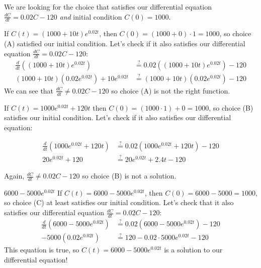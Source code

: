 \documentclass{article}
\begin{document}
\begin{enumerate}
\begin{enumerate}
      \begin{solution}
        We are looking for the choice that satisfies our differential
        equation $\frac{dC}{dt} = 0.02 C - 120$ \emph{and} initial
        condition $C(0) = 1000$.   
        \begin{enumerate}
            \plainitem If $C(t)=(1000 + 10t) e^{0.02 t}$, then $C(0)=(1000+0)\cdot 1=1000$, so choice (A) satisfied our initial condition. Let's check if it also satisfies our differential equation $\frac{dC}{dt} = 0.02 C - 120$: 
            \begin{align*}
          \frac{d}{dt} \left( (1000 + 10t) e^{0.02 t} \right) &
          \stackrel{?}{=} 0.02 \left( (1000 + 10t) e^{0.02 t} \right) -
          120 \\
          (1000+10t) \left(0.02 e^{0.02 t} \right) + 10 e^{0.02t}& \stackrel{?}{=} (1000+10t) \left(0.02 e^{0.02 t} \right) - 120
        \end{align*}
        We can see that $\frac{dC}{dt} \neq 0.02 C - 120$ so choice (A) is not the right function.
            
            \plainitem If $C(t)=1000 e^{0.02 t} + 120 t$ then $C(0)=(1000\cdot 1)+0=1000$, so choice (B) satisfies our initial condition. Let's check if it also satisfies our differential equation: 

            \begin{align}
                \frac{d}{dt} \left( 1000 e^{0.02 t} + 120 t \right) &
          \stackrel{?}{=} 0.02 \left( 1000 e^{0.02 t} + 120 t \right) -
          120 \\
          20 e^{0.02 t} + 120 &
          \stackrel{?}{=} 20e^{0.02 t} + 2.4 t -
          120
            \end{align}

            Again, $\frac{dC}{dt} \neq 0.02 C - 120$ so choice (B) is not a solution.
            
            \plainitem $6000 - 5000 e^{0.02 t}$
            If $C(t) = 6000 - 5000 e^{0.02 t}$, then $C(0) =
        6000 - 5000 = 1000$, so choice (C) at least satisfies our initial
        condition.  Let's check that it also satisfies our differential
        equation $\frac{dC}{dt} = 0.02 C - 120$:
        \begin{align*}
          \frac{d}{dt} \left( 6000 - 5000 e^{0.02 t } \right) &
          \stackrel{?}{=} 0.02 \left( 6000 - 5000 e^{0.02 t } \right) -
          120 \\
          - 5000 \left(0.02 e^{0.02 t} \right) & \stackrel{?}{=} 120 -
          0.02 \cdot 5000 e^{0.02 t} - 120
        \end{align*}
        This equation is true, so $C(t) = 6000 - 5000 e^{0.02 t}$ is a solution to our differential equation!
            

\end{enumerate}
\end{solution}
\end{enumerate}
\end{enumerate}
\end{document}
